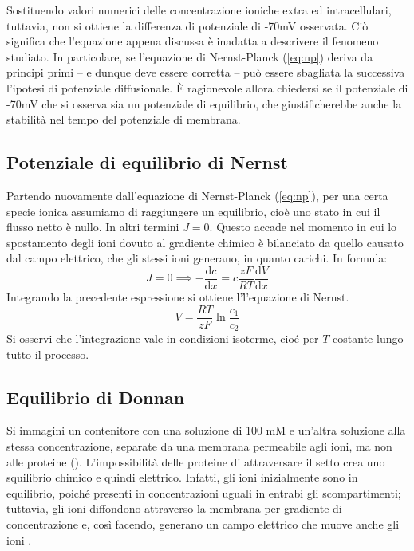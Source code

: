 Sostituendo valori numerici delle concentrazione ioniche extra ed intracellulari, tuttavia, non si ottiene la differenza di potenziale di -70mV osservata. Ciò significa che l'equazione appena discussa è inadatta a descrivere il fenomeno studiato. In particolare, se l'equazione di Nernst-Planck (\autoref{eq:np}) deriva da principi primi -- e dunque deve essere corretta -- può essere sbagliata la successiva l'ipotesi di potenziale diffusionale. È ragionevole allora chiedersi se il potenziale di -70mV che si osserva sia un potenziale di equilibrio, che giustificherebbe anche la stabilità nel tempo del potenziale di membrana.

\subsection{Potenziale di equilibrio di Nernst}
Partendo nuovamente dall'equazione di Nernst-Planck (\autoref{eq:np}), per una certa specie ionica assumiamo di raggiungere un equilibrio, cioè uno stato in cui il flusso netto è nullo. In altri termini $J=0$. Questo accade nel momento in cui lo spostamento degli ioni dovuto al gradiente chimico è bilanciato da quello causato dal campo elettrico, che gli stessi ioni generano, in quanto carichi. In formula:
\begin{equation*}
    J = 0 \implies -  \frac{\mathrm{d}c}{\mathrm{d}x} = c \frac{z F}{RT} \frac{\mathrm{d}V}{\mathrm{d}x}
\end{equation*}
Integrando la precedente espressione si ottiene l'\h{l'equazione di Nernst}.
\begin{equation}
    \label{eq:n}
    \boxed{
    V =  \frac{RT}{zF} \ln{\frac{c_1}{c_2}}
    }
\end{equation}
Si osservi che l'integrazione vale in condizioni isoterme, cioé per $T$ costante lungo tutto il processo.

\subsection{Equilibrio di Donnan}
Si immagini un contenitore con una soluzione di  100 mM e un'altra soluzione  alla stessa concentrazione, separate da una membrana permeabile agli ioni, ma non alle proteine (). L'impossibilità delle proteine di attraversare il setto crea uno squilibrio chimico e quindi elettrico. Infatti, gli ioni  inizialmente sono in equilibrio, poiché presenti in concentrazioni uguali in entrabi gli scompartimenti; tuttavia, gli ioni  diffondono attraverso la membrana per gradiente di concentrazione e, così facendo, generano un campo elettrico che muove anche gli ioni .


